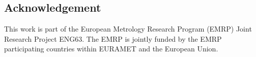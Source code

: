 \documentclass[10pt]{article}
\begin{document}
\begin{spacing}{1}
\section*{Acknowledgement}
This work is part of the European Metrology Research Program (EMRP) Joint Research Project ENG63. The EMRP is jointly funded by the EMRP participating countries within EURAMET and the European Union.




\end{spacing}
\end{document}
